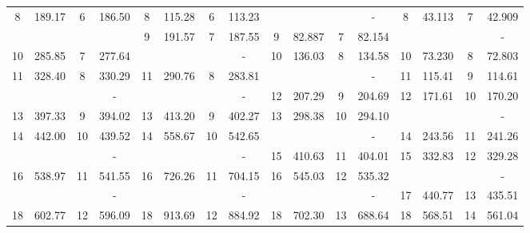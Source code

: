 \documentclass[../../main.tex]{subfiles}
\begin{document}
\begin{table}[h!]
{{\begin{tabular}{|cccc||cccc||cccc||cccc|}
		{8} & {189.17} &  6     & {186.50} & 8     & 115.28 & 6     & 113.23 & \cellcolor{lightgray}{8}     & \cellcolor{lightgray}{69.344} &       & {-} & 8     & 43.113 & 7     & 42.909 \\
		\cellcolor{lightgray}{9} & \cellcolor{lightgray}{192.61} &      &  & {9}     & {191.57} &   7  & {187.55} & 9     & 82.887 & 7     & 82.154 & \cellcolor{lightgray}{9}     & \cellcolor{lightgray}{69.331} &       & {-} \\
		{10} & 285.85 & 7     & 277.64 & \cellcolor{lightgray}{10}    & \cellcolor{lightgray}{192.03} &      & {-} & 10    & 136.03 & 8     & 134.58 & 10    & 73.230 & 8     & 72.803 \\
		{11} & 328.40 & 8     & 330.29 & 11    & 290.76 & 8     & 283.81 & \cellcolor{lightgray}{11}    & \cellcolor{lightgray}{192.48} &       & {-} & 11    & 115.41 & 9     & 114.61 \\
		\cellcolor{lightgray}{12} & \cellcolor{lightgray}{357.08} &       & {-} & \cellcolor{lightgray}{12}    & \cellcolor{lightgray}{374.45} &       & {-} & 12    & 207.29 & 9     & 204.69 & 12    & 171.61 & 10    & 170.20 \\
		{13} & 397.33 & 9     & 394.02 & 13    & 413.20 & 9     & 402.27 & 13    & 298.38 & 10    & 294.10 & \cellcolor{lightgray}{13}    & \cellcolor{lightgray}{192.52} &       & {-} \\
		{14} & 442.00   & 10    & 439.52 & 14    & 558.67 & 10    & 542.65 & \cellcolor{lightgray}{14}    & \cellcolor{lightgray}{376.83} &       & {-} & 14    & 243.56 & 11    & 241.26 \\
		\cellcolor{lightgray}{15} & \cellcolor{lightgray}{533.71} &       & {-} & \cellcolor{lightgray}{15}    & \cellcolor{lightgray}{614.11} &       & {-} & 15    & 410.63 & 11    & 404.01 & 15    & 332.83 & 12    & 329.28 \\
		{16} & 538.97 & 11    & 541.55 & 16    & 726.26 & 11    & 704.15 & 16    & 545.03 & 12    & 535.32 & \cellcolor{lightgray}{16}    & \cellcolor{lightgray}{377.16} &       & {-} \\
		\cellcolor{lightgray}{17} & \cellcolor{lightgray}{596.06} &       & {-} & \cellcolor{lightgray}{17}    & \cellcolor{lightgray}{906.28} &       & {-} & \cellcolor{lightgray}{17}    & \cellcolor{lightgray}{621.95} &       & {-} & 17    & 440.77 & 13    & 435.51 \\
		{18} & 602.77 & 12    & 596.09 & 18    & 913.69 & 12    & 884.92 & 18    & 702.30 & 13    & 688.64 & 18    & 568.51 & 14    & 561.04 \\

\end{tabular}}}
\end{table}
\end{document}
